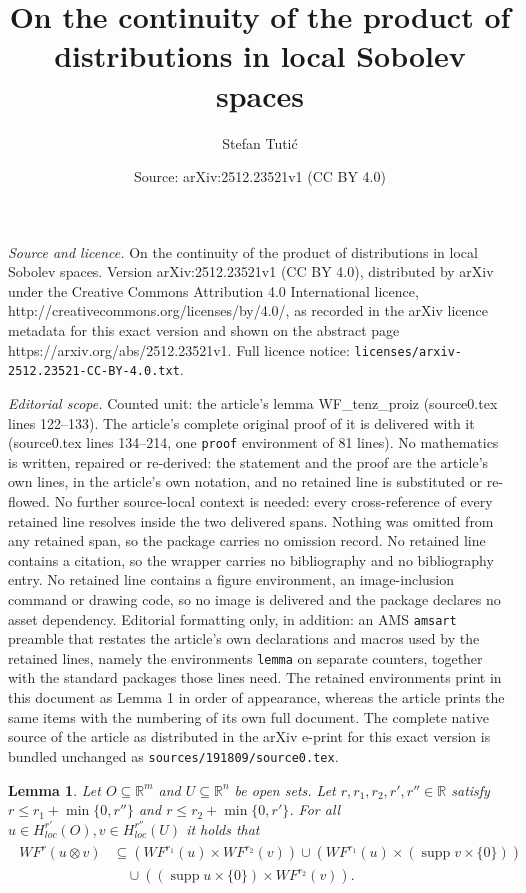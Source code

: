 \documentclass[10pt,a4paper]{amsart}
\title{On the continuity of the product of distributions in local Sobolev spaces}
\author{Stefan Tuti\'c}
\date{Source: arXiv:2512.23521v1 (CC BY 4.0)}
\newtheorem{lemma}{Lemma}
\newcommand{\supp}{\operatorname{supp}}
\begin{document}
\maketitle

\noindent\emph{Source and licence.} On the continuity of the product of distributions in local Sobolev spaces. Version arXiv:2512.23521v1 (CC BY 4.0), distributed by arXiv under the Creative Commons Attribution 4.0 International licence, http://creativecommons.org/licenses/by/4.0/, as recorded in the arXiv licence metadata for this exact version and shown on the abstract page https://arxiv.org/abs/2512.23521v1. Full licence notice: \texttt{licenses/arxiv-2512.23521-CC-BY-4.0.txt}.\par\smallskip

\noindent\textit{Editorial scope.} Counted unit: the article's lemma WF\_tenz\_proiz (source0.tex lines 122--133). The article's complete original proof of it is delivered with it (source0.tex lines 134--214, one \texttt{proof} environment of 81 lines). No mathematics is written, repaired or re-derived: the statement and the proof are the article's own lines, in the article's own notation, and no retained line is substituted or re-flowed.  No further source-local context is needed: every cross-reference of every retained line resolves inside the two delivered spans.  Nothing was omitted from any retained span, so the package carries no omission record.  No retained line contains a citation, so the wrapper carries no bibliography and no bibliography entry.  No retained line contains a figure environment, an image-inclusion command or drawing code, so no image is delivered and the package declares no asset dependency.  Editorial formatting only, in addition: an AMS \texttt{amsart} preamble that restates the article's own declarations and macros used by the retained lines, namely the environments \texttt{lemma} on separate counters, together with the standard packages those lines need.  The retained environments print in this document as Lemma 1 in order of appearance, whereas the article prints the same items with the numbering of its own full document.  The complete native source of the article as distributed in the arXiv e-print for this exact version is bundled unchanged as \texttt{sources/191809/source0.tex}.
\begin{lemma}
\label{WF_tenz_proiz}
Let $O\subseteq \mathbb{R}^m$ and $U\subseteq \mathbb{R}^n$ be open sets. Let $r,r_1,r_2,r',r''\in\mathbb{R}$ satisfy $r \leq r_1 + \min \{0,r''\}$ and $r \leq r_2 + \min \{0,r'\}$. For all $u\in H_{loc} ^{r'} (O), v\in H_{loc} ^{r''} (U)$ it holds that
\begin{align}
\label{talsnifrontinkl}
\begin{split}
WF^r (u\otimes v)
&\subseteq (WF^{r_1} (u) \times WF^{r_2} (v)) \cup (WF^{r_1} (u) \times (\supp v \times \{0\})) \\
&\quad \cup ((\supp u \times \{0 \}) \times WF^{r_2} (v)).
\end{split}
\end{align}
\end{lemma}
\end{document}
